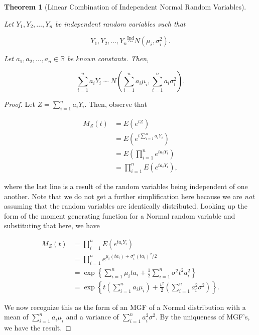 \documentclass[
  letterpaper,
  DIV=11,
  numbers=noendperiod]{scrreprt}
\theoremstyle{definition}
\theoremstyle{plain}
\newtheorem{theorem}{Theorem}[chapter]
\theoremstyle{definition}
\theoremstyle{remark}
\begin{document}
\begin{theorem}[Linear Combination of Independent Normal Random
Variables]\protect\hypertarget{thm-normal-linear-combination}{}\label{thm-normal-linear-combination}

Let \(Y_1, Y_2, \dotsc, Y_n\) be independent random variables such that

\[Y_1, Y_2, \dotsc, Y_n \stackrel{\text{Ind}}{\sim} N\left(\mu_i, \sigma^2_i\right).\]

Let \(a_1, a_2, \dotsc, a_n \in \mathbb{R}\) be known constants. Then,

\[\sum_{i=1}^{n} a_i Y_i \sim N\left(\sum_{i=1}^{n} a_i \mu_i, \sum_{i=1}^{n} a_i \sigma^2_i\right).\]

\end{theorem}

\begin{proof}
Let \(Z = \sum_{i=1}^{n} a_i Y_i\). Then, observe that

\[
\begin{aligned}
  M_Z(t) 
    &= E\left(e^{tZ}\right) \\
    &= E\left(e^{t \sum_{i=1}^{n} a_i Y_i}\right) \\
    &= E\left(\prod_{i=1}^{n} e^{ta_i Y_i}\right) \\
    &= \prod_{i=1}^{n} E\left(e^{t a_i Y_i}\right),
\end{aligned}
\]

where the last line is a result of the random variables being
independent of one another. Note that we do not get a further
simplification here because we are \emph{not} assuming that the random
variables are identically distributed. Looking up the form of the moment
generating function for a Normal random variable and substituting that
here, we have

\[
\begin{aligned}
  M_Z(t) 
    &= \prod_{i=1}^{n} E\left(e^{t a_i Y_i}\right) \\
    &= \prod_{i=1}^{n} e^{\mu_i \left(t a_i\right) + \sigma_i^2 \left(t a_i\right)^2 / 2} \\
    &= \exp\left\{\sum_{i=1}^{n} \mu_i t a_i + \frac{1}{2} \sum_{i=1}^{n} \sigma^2 t^2 a_i^2\right\} \\
    &= \exp\left\{t \left(\sum_{i=1}^{n} a_i \mu_i\right) + \frac{t^2}{2} \left(\sum_{i=1}^{n} a_i^2 \sigma^2\right)\right\}.
\end{aligned}
\]

We now recognize this as the form of an MGF of a Normal distribution
with a mean of \(\sum_{i=1}^{n} a_i \mu_i\) and a variance of
\(\sum_{i=1}^{n} a_i^2 \sigma^2\). By the uniqueness of MGF's, we have
the result.
\end{proof}
\end{document}
